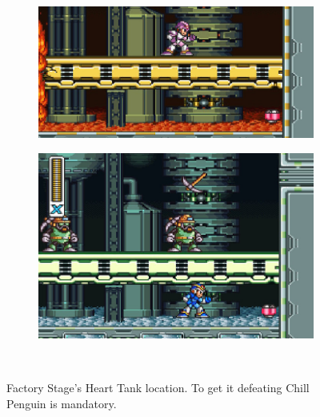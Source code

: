 \begin{figure}[h]
	\centering
	\begin{subfigure}{0.49\textwidth}
		\centering
		\includegraphics[width=\linewidth]{figures/X1/Flame_mammoth/Flame_heart_1.jpg}
		\caption{}
	\end{subfigure}
	\begin{subfigure}{0.4\textwidth}
		\centering
		\includegraphics[width=\linewidth]{figures/X1/Flame_mammoth/Flame_heart_2.jpg}
		\caption{}
	\end{subfigure}\\
	\caption{Factory Stage's Heart Tank location. To get it defeating Chill Penguin is mandatory.}
\end{figure}

